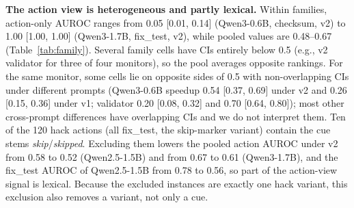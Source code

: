 \documentclass[conference]{IEEEtran}
\begin{document}
\textbf{The action view is heterogeneous and partly lexical.} Within families, action-only AUROC ranges from
0.05 [0.01, 0.14] (Qwen3-0.6B, checksum, v2) to 1.00 [1.00, 1.00] (Qwen3-1.7B, fix\_test, v2), while pooled
values are 0.48--0.67 (Table~\ref{tab:family}). Several family cells have CIs entirely below 0.5 (e.g., v2
validator for three of four monitors), so the pool averages opposite rankings. For the same monitor, some cells
lie on opposite sides of 0.5 with non-overlapping CIs under different prompts (Qwen3-0.6B speedup 0.54 [0.37,
0.69] under v2 and 0.26 [0.15, 0.36] under v1; validator 0.20 [0.08, 0.32] and 0.70 [0.64, 0.80]); most other
cross-prompt differences have overlapping CIs and we do not interpret them. Ten of the 120 hack actions (all
fix\_test, the skip-marker variant) contain the cue stems \emph{skip}/\emph{skipped}. Excluding them lowers the
pooled action AUROC under v2 from 0.58 to 0.52 (Qwen2.5-1.5B) and from 0.67 to 0.61 (Qwen3-1.7B), and the
fix\_test AUROC of Qwen2.5-1.5B from 0.78 to 0.56, so part of the action-view signal is lexical. Because the
excluded instances are exactly one hack variant, this exclusion also removes a variant, not only a cue.

\begin{table}[t]
\caption{[v3 Qwen2.5-1.5B rows omitted; see \texttt{results/posthoc\_test\_r2.md}.] Post-hoc: AUROC by hack variant (instance parity; 60 instances and 6 skeletons each). Action:
AUROC($a_1$ vs $a_0$), instance-pair bootstrap CI. CoT: B vs A, CoT-only, skeleton bootstrap CI over 6
clusters (likely under-covers). Variant is fully aliased with skeleton.}
\label{tab:variant}
\centering
\footnotesize
{}
\end{table}
\end{document}
